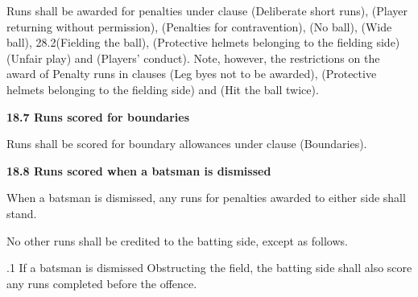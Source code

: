 \documentclass[12pt]{article}
\begin{document}
\vspace{\baselineskip}
\begin{adjustwidth}{0.0in}{0.12in}
{\fontsize{9pt}{10.8pt}\selectfont Runs shall be awarded for penalties under clause (Deliberate short runs), (Player returning without permission), (Penalties for contravention), (No ball), (Wide ball), 28.2(Fielding the ball), (Protective helmets belonging to the fielding side) (Unfair play) and (Players’ conduct). Note, however, the restrictions on the award of Penalty runs in clauses (Leg byes not to be awarded), (Protective helmets belonging to the fielding side) and (Hit the ball twice).\par}\par

\end{adjustwidth}


\vspace{\baselineskip}
{\fontsize{11pt}{13.2pt}\selectfont \textbf{18.7 \tabto{0.47in} Runs scored for boundaries}\par}\par


\vspace{\baselineskip}
{\fontsize{9pt}{10.8pt}\selectfont Runs shall be scored for boundary allowances under clause (Boundaries).\par}\par


\vspace{\baselineskip}
{\fontsize{11pt}{13.2pt}\selectfont \textbf{18.8 \tabto{0.47in} Runs scored when a batsman is dismissed}\par}\par


\vspace{\baselineskip}
{\fontsize{9pt}{10.8pt}\selectfont When a batsman is dismissed, any runs for penalties awarded to either side shall stand.\par}\par


\vspace{\baselineskip}
{\fontsize{9pt}{10.8pt}\selectfont No other runs shall be credited to the batting side, except as follows.\par}\par


\vspace{\baselineskip}
\begin{adjustwidth}{0.5in}{0.12in}
{\fontsize{9pt}{10.8pt}.1 \tabto{0.49in} If a batsman is dismissed Obstructing the field, the batting side shall also score any runs completed before the offence.\par}\par

\end{adjustwidth}
\end{document}
